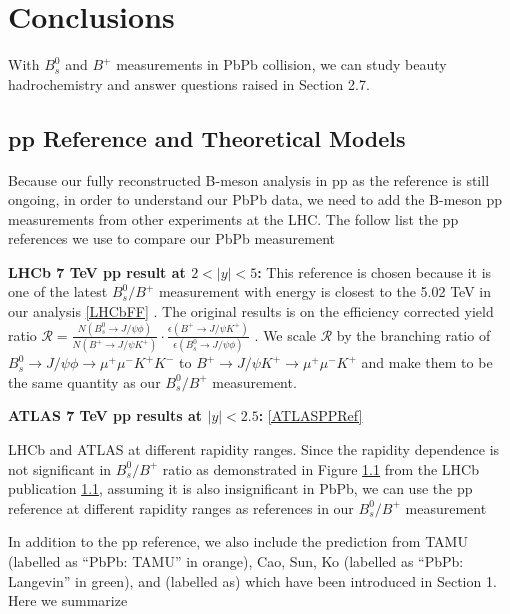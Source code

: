 \chapter{Conclusions}

With $B^0_s$ and $B^+$ measurements in PbPb collision, we can study beauty hadrochemistry and answer questions raised in Section 2.7.

\section{pp Reference and Theoretical Models}

Because our fully reconstructed B-meson analysis in pp as the reference is still ongoing, in order to understand our PbPb data, we need to add the B-meson pp measurements from other experiments at the LHC. The follow list the pp references we use to compare our PbPb measurement

\textbf{LHCb 7 TeV pp result at $2 < |y| < 5$:} This reference is chosen because it is one of the latest $B^0_s/B^+$ measurement with energy is closest to the 5.02 TeV in our analysis \ref{LHCbFF} . The original results is on the efficiency corrected yield ratio $\mathcal{R} = \frac{N(B^0_s \rightarrow J/\psi \phi)}{N(B^+ \rightarrow J/\psi K^+)} \cdot \frac{\epsilon(B^+ \rightarrow J/\psi K^+)}{\epsilon(B^0_s \rightarrow J/\psi \phi)}$ \cite{LHCbFF}. We scale $\mathcal{R}$ by the branching ratio of $B^0_s \rightarrow J/\psi \phi \rightarrow \mu^+\mu^- K^+ K^-$ to $B^+ \rightarrow J/\psi K^+ \rightarrow \mu^+\mu^- K^+$ and make them to be the same quantity as our $B^0_s/B^+$ measurement.

\textbf{ATLAS 7 TeV pp results at $|y| < 2.5$:}  \ref{ATLASPPRef} 


LHCb and ATLAS at different rapidity ranges. Since the rapidity dependence is not significant in $B^0_s/B^+$ ratio as demonstrated in Figure \ref{} from the LHCb publication \ref{}, assuming it is also insignificant in PbPb, we can use the pp reference at different rapidity ranges as references in our $B^0_s/B^+$ measurement

In addition to the pp reference, we also include the prediction from TAMU (labelled as ``PbPb: TAMU'' in orange), Cao, Sun, Ko (labelled as ``PbPb: Langevin'' in green), and (labelled as) which have been introduced in Section 1. Here we summarize 

